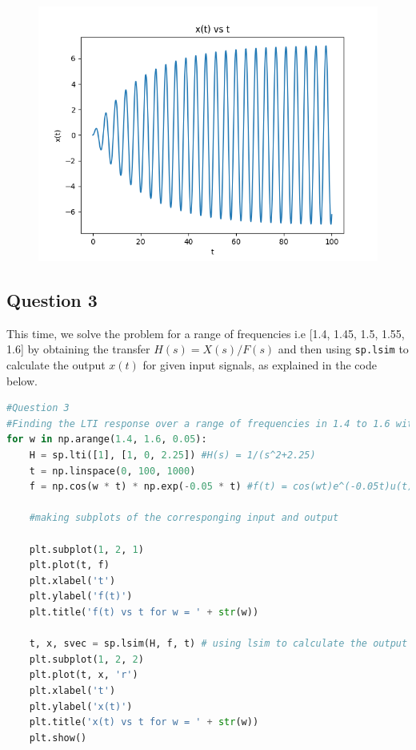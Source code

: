 \documentclass[11pt, a4paper]{article}
\begin{document}
\begin{figure}[H]
     \centering
     \includegraphics[scale=0.8]{Figure_2.png}
\end{figure}


\subsection{Question 3}
 
This time, we solve the problem for a range of frequencies i.e [1.4, 1.45, 1.5, 1.55, 1.6] by obtaining the transfer $H(s) = X(s)/F(s)$ and then using \texttt{sp.lsim} to calculate the output $x(t)$ for given input signals, as explained in the code below.

\begin{lstlisting}[language = Python]
#Question 3
#Finding the LTI response over a range of frequencies in 1.4 to 1.6 with step of 0.05
for w in np.arange(1.4, 1.6, 0.05):
    H = sp.lti([1], [1, 0, 2.25]) #H(s) = 1/(s^2+2.25)
    t = np.linspace(0, 100, 1000) 
    f = np.cos(w * t) * np.exp(-0.05 * t) #f(t) = cos(wt)e^(-0.05t)u(t)

    #making subplots of the corresponging input and output

    plt.subplot(1, 2, 1)
    plt.plot(t, f)
    plt.xlabel('t')
    plt.ylabel('f(t)')
    plt.title('f(t) vs t for w = ' + str(w))

    t, x, svec = sp.lsim(H, f, t) # using lsim to calculate the output of the system
    plt.subplot(1, 2, 2)
    plt.plot(t, x, 'r')
    plt.xlabel('t')
    plt.ylabel('x(t)')
    plt.title('x(t) vs t for w = ' + str(w))
    plt.show()


\end{lstlisting}
\end{document}
